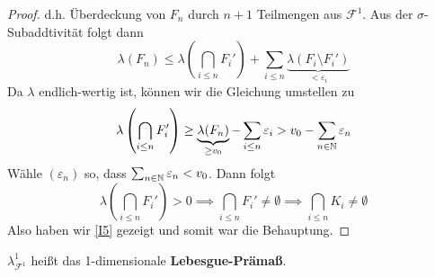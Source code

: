 \begin{satz}
\begin{proof}
d.h. Überdeckung von $F_n$ durch $n+1$ Teilmengen aus $\mathcal{F}^1$. Aus der $\sigma$-Subaddtivität folgt dann
$$
\lambda (F_n) \leq \lambda \left( \bigcap_{i\leq n} F_i' \right) + \sum_{i \leq n} \underbrace{\lambda (F_i \setminus F_i')}_{< \varepsilon_i}
$$
Da $\lambda$ endlich-wertig ist, können wir die Gleichung umstellen zu
$$
\lambda\left( \bigcap_{i \leq n} F_i' \right) \geq \underbrace{\lambda(F_n)}_{\geq v_0} - \sum_{i \leq n} \varepsilon_i > v_0 - \sum_{n \in \mathbb{N}} \varepsilon_n
$$
Wähle $(\varepsilon_n)$ so, dass $\sum_{n\in \mathbb{N}} \varepsilon_n < v_0$. Dann folgt
$$\lambda \left( \bigcap_{i \leq n } F_i' \right) > 0 \implies \bigcap_{i \leq n} F_i' \neq \emptyset \implies \bigcap_{i \leq n }K_i \neq \emptyset $$
Also haben wir \eqref{I5} gezeigt und somit war die Behauptung.
\end{proof}
\end{satz}

\begin{definition}
\begin{mdframed}
$\lambda^1_{\mathcal{F}^1}$ heißt das 1-dimensionale \textbf{Lebesgue-Prämaß}.
\end{mdframed}
\end{definition}

